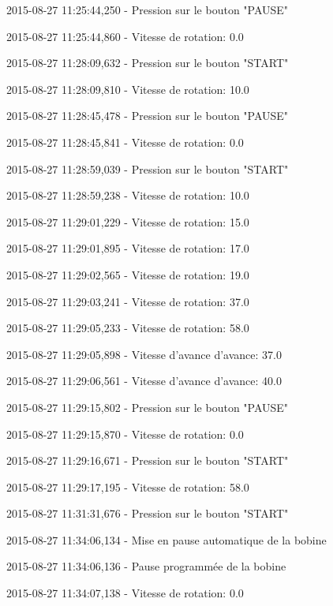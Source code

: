 \documentclass[a4paper, 11pt]{article}
\begin{document}
2015-08-27 11\string:25\string:44,250 - Pression sur le bouton "PAUSE"

2015-08-27 11\string:25\string:44,860 - Vitesse de rotation\string: 0.0

2015-08-27 11\string:28\string:09,632 - Pression sur le bouton "START"

2015-08-27 11\string:28\string:09,810 - Vitesse de rotation\string: 10.0

2015-08-27 11\string:28\string:45,478 - Pression sur le bouton "PAUSE"

2015-08-27 11\string:28\string:45,841 - Vitesse de rotation\string: 0.0

2015-08-27 11\string:28\string:59,039 - Pression sur le bouton "START"

2015-08-27 11\string:28\string:59,238 - Vitesse de rotation\string: 10.0

2015-08-27 11\string:29\string:01,229 - Vitesse de rotation\string: 15.0

2015-08-27 11\string:29\string:01,895 - Vitesse de rotation\string: 17.0

2015-08-27 11\string:29\string:02,565 - Vitesse de rotation\string: 19.0

2015-08-27 11\string:29\string:03,241 - Vitesse de rotation\string: 37.0

2015-08-27 11\string:29\string:05,233 - Vitesse de rotation\string: 58.0

2015-08-27 11\string:29\string:05,898 - Vitesse d'avance d'avance\string: 37.0

2015-08-27 11\string:29\string:06,561 - Vitesse d'avance d'avance\string: 40.0

2015-08-27 11\string:29\string:15,802 - Pression sur le bouton "PAUSE"

2015-08-27 11\string:29\string:15,870 - Vitesse de rotation\string: 0.0

2015-08-27 11\string:29\string:16,671 - Pression sur le bouton "START"

2015-08-27 11\string:29\string:17,195 - Vitesse de rotation\string: 58.0

2015-08-27 11\string:31\string:31,676 - Pression sur le bouton "START"

2015-08-27 11\string:34\string:06,134 - Mise en pause automatique de la bobine

2015-08-27 11\string:34\string:06,136 - Pause programmée de la bobine

2015-08-27 11\string:34\string:07,138 - Vitesse de rotation\string: 0.0
\end{document}

